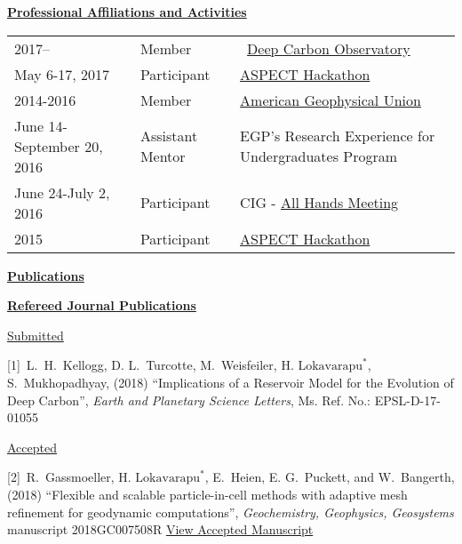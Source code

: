\documentclass[11pt]{ltxdoc}
\begin{document}
\newpage

\vskip 12pt

\begin{center}
	\textbf{\underline{Professional Affiliations and Activities}}
\end{center}

\vskip -06pt

\addtolength{\tabcolsep}{15pt}   
\begin{tabular}{lll}
  2017--     & Member & ~\href{https://deepcarbon.net/}{Deep Carbon Observatory} \\[06pt]
  May 6-17, 2017 & Participant & \href{https://geodynamics.org/cig/events/calendar/2017-aspect-hack/}{ASPECT Hackathon} \\[06pt]
  2014-2016     & Member & 
 \href{ https://sites.agu.org}{ American Geophysical Union } \\[06pt]
  June 14-September 20, 2016 & Assistant Mentor & EGP's Research Experience for Undergraduates Program \\[06pt]
  June 24-July 2, 2016     & Participant & CIG - \href{https://geodynamics.org/cig/events/calendar/2016-cig-all-hands-meeting/}{All Hands Meeting} \\[06pt]
  2015     & Participant & \href{https://geodynamics.org/cig/events/calendar/2016-cig-all-hands-meeting/2016-aspect-hack/?eID=1233}{ASPECT Hackathon}\\[06pt]
  

\end{tabular}
\addtolength{\tabcolsep}{1pt}  


\begin{center}
  \textbf{\underline{Publications}}
\end{center}

\noindent
\textbf{\underline{Refereed Journal Publications}}


\noindent
\underline{Submitted}

\hangindent 20pt
[1]~L.~H.~Kellogg, D. L.~Turcotte, M.~Weisfeiler, $\textrm{H.~Lokavarapu}^*$, S.~Mukhopadhyay, (2018) 
``Implications of a Reservoir Model for the
Evolution of Deep Carbon'', 
\textit{Earth and Planetary Science Letters}, Ms. Ref. No.:  EPSL-D-17-01055

\noindent
\underline{Accepted}

\hangindent 20pt
[2]~R.~Gassmoeller,  $\textrm{H.~Lokavarapu}^*$, E.~Heien, E. G.~Puckett, and W.~Bangerth, (2018) 
``Flexible and scalable particle-in-cell methods with adaptive mesh refinement for geodynamic computations'', 
\textit{Geochemistry, Geophysics, Geosystems} manuscript 2018GC007508R 
\href{https://www.math.ucdavis.edu/~egp/PUBLICATIONS/JOURNAL_ARTICLES/ACCEPTED/RG-HL-EH-EGP-WB-2018.pdf}{View Accepted Manuscript}
\end{document}
